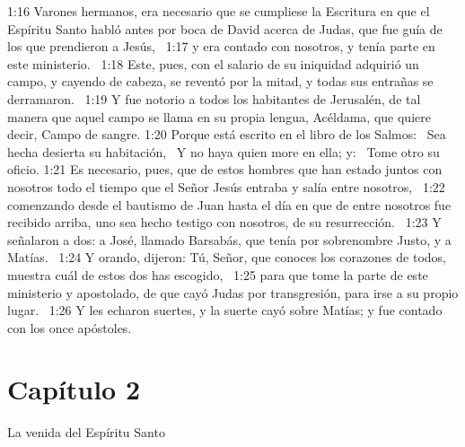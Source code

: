 1:16 Varones hermanos, era necesario que se cumpliese la Escritura en que el Espíritu Santo habló antes por boca de David acerca de Judas, que fue guía de los que prendieron a Jesús,  
1:17 y era contado con nosotros, y tenía parte en este ministerio.  
1:18 Este, pues, con el salario de su iniquidad adquirió un campo, y cayendo de cabeza, se reventó por la mitad, y todas sus entrañas se derramaron.  
1:19 Y fue notorio a todos los habitantes de Jerusalén, de tal manera que aquel campo se llama en su propia lengua, Acéldama, que quiere decir, Campo de sangre. 
1:20 Porque está escrito en el libro de los Salmos:  
Sea hecha desierta su habitación,  
Y no haya quien more en ella; 
y:  
Tome otro su oficio. 
1:21 Es necesario, pues, que de estos hombres que han estado juntos con nosotros todo el tiempo que el Señor Jesús entraba y salía entre nosotros,  
1:22 comenzando desde el bautismo de Juan hasta el día en que de entre nosotros fue recibido arriba, uno sea hecho testigo con nosotros, de su resurrección.  
1:23 Y señalaron a dos: a José, llamado Barsabás, que tenía por sobrenombre Justo, y a Matías.  
1:24 Y orando, dijeron: Tú, Señor, que conoces los corazones de todos, muestra cuál de estos dos has escogido,  
1:25 para que tome la parte de este ministerio y apostolado, de que cayó Judas por transgresión, para irse a su propio lugar.  
1:26 Y les echaron suertes, y la suerte cayó sobre Matías; y fue contado con los once apóstoles.  
\section*{Capítulo 2}
La venida del Espíritu Santo  

